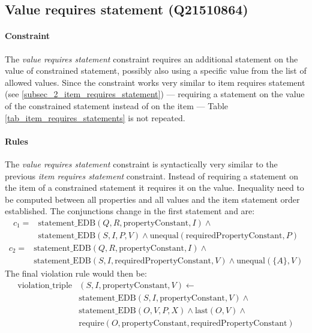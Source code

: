 \documentclass[hyperref,bachelorofscience,fleqn]{cgvpub}
\begin{document}
\subsection{Value requires statement (Q21510864)}\label{subsec_2_value_requires_statement}
\paragraph{Constraint}
The \emph{value requires statement} constraint requires an additional statement on the value of constrained statement, possibly also using a specific value from the list of allowed values. Since the constraint works very similar to item requires statement (see \ref{subsec_2_item_requires_statement}) --- requiring a statement on the value of the constrained statement instead of on the item --- Table \ref{tab_item_requires_statements} is not repeated.

\paragraph{Rules}
The \emph{value requires statement} constraint is syntactically very similar to the previous \emph{item requires statement} constraint. Instead of requiring a statement on the item of a constrained statement it requires it on the value. Inequality need to be computed between all properties and all values and the item statement order established. The conjunctions change in the first statement and are:
\begin{equation*}
\begin{split}
c_1 = &\text{statement\_EDB}(Q, R, \text{propertyConstant}, I) \wedge{} \\
&\text{statement\_EDB}(S, I, P, V) \wedge \text{unequal}(\text{requiredPropertyConstant}, P)
\end{split}
\end{equation*} \(\)
\begin{equation*}
\begin{split}
c_2 = &\text{statement\_EDB}(Q, R, \text{propertyConstant}, I) \wedge{} \\
&\text{statement\_EDB}(S, I, \text{requiredPropertyConstant}, V) \wedge \text{unequal}(\{A\}, V)
\end{split}
\end{equation*}
The final violation rule would then be:
\begin{equation*}
\begin{split}
\text{violation\_triple}&(S, I, \text{propertyConstant}, V) \leftarrow \\
&\text{statement\_EDB}(S, I, \text{propertyConstant}, V) \wedge{} \\
&\text{statement\_EDB}(O, V, P, X) \wedge \text{last}(O, V) \wedge{} \\
&\text{require}(O, \text{propertyConstant}, \text{requiredPropertyConstant})
\end{split}
\end{equation*}
\end{document}
